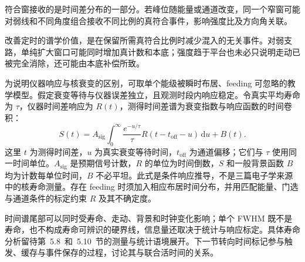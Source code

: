 符合窗接收的是时间差分布的一部分。若峰位随能量或通道改变，同一个窄窗可能对弱线和不同角度组合接收不同比例的真符合事件，影响强度比及方向角关联。

改善定时的谱学价值，是在保留所需真符合比例时减少混入的无关事件。对弱支路，单纯扩大窗口可能同时增加真计数和本底；强度趋于平台也未必只说明走动已被完全消除，还可能由本底补偿所致。

为说明仪器响应与核衰变的区别，可取单个能级被瞬时布居、feeding 可忽略的教学模型。假定衰变等待与仪器误差独立，且观测时段内响应稳定。令真实平均寿命为 $\tau$，仪器时间差响应为 $R(t)$，测得时间差谱为衰变指数与响应函数的时间卷积：
\begin{equation}\label{eq:5-4-st-conv}
S(t) = A_{\mathrm{sig}} \int_0^\infty \frac{e^{-u/\tau}}{\tau} R(t - t_{\mathrm{off}} - u) \, \mathrm{d}u + B(t).
\end{equation}
这里 $t$ 为测得时间差，$u$ 为真实衰变等待时间，$t_{\mathrm{off}}$ 为通道偏移；它们与 $\tau$ 使用同一时间单位。$A_{\mathrm{sig}}$ 是预期信号计数，$R$ 的单位为时间倒数，$S$ 和一般背景函数 $B$ 均为计数每单位时间，$B$ 不必平坦。此式是条件响应推导，不是三篇电子学来源中的核寿命测量。存在 feeding 时须加入相应布居时间分布，并用匹配能量、门选与通道条件的标定约束 $R$ 及其不确定度。

时间谱尾部可以同时受寿命、走动、背景和时钟变化影响；单个 FWHM 既不是寿命，也不构成寿命可辨识的硬界线，信息量还取决于统计与响应标定。具体寿命分析留待第~5.8~和~5.10~节的测量与统计语境展开。下一节转向时间标记参与触发、缓存与事件保存的过程，讨论其与联合活时间的关系。
